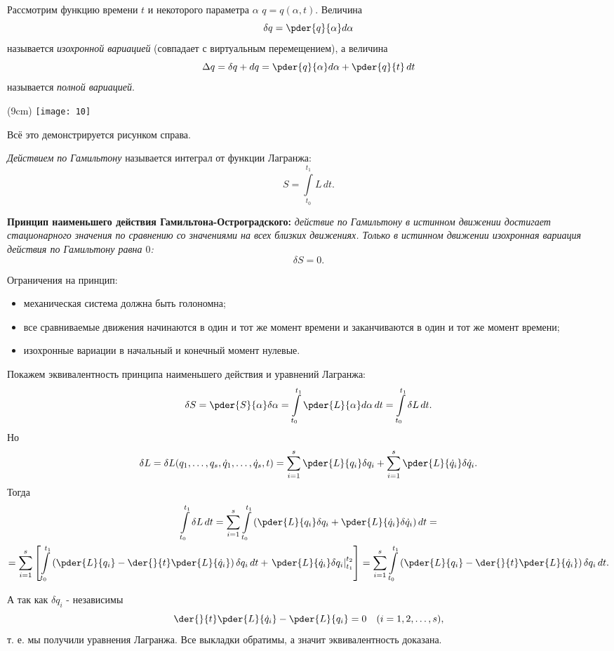 
Рассмотрим функцию времени \( t \) и некоторого параметра \( \alpha \)
\( q=q(\alpha, t) \). Величина 
\[
    \delta q= \pder{q}{\alpha} d\alpha
\]
называется \textit{изохронной вариацией} (совпадает с виртуальным перемещением),
а величина
\[
    \Delta q= \delta q + d q = \pder{q}{\alpha} d\alpha + \pder{q}{t}\,dt
\]
называется \textit{полной вариацией}.


\sidefig(9cm)
{\texttt{[image: 10]}}
{Всё это демонстрируется рисунком справа.

\textit{Действием по Гамильтону} называется интеграл от функции Лагранжа:
\[
        S = \int\limits_{t_0}^{t_1} L\,dt.
\]
}   
\textbf{Принцип наименьшего действия Гамильтона-Остроградского:} \emph{действие
по Гамильтону в истинном движении достигает стационарного значения по сравнению
со значениями на всех близких движениях. Только в истинном движении изохронная
вариация действия по Гамильтону равна \( 0 \):}
\[
    \delta S = 0.
\]

Ограничения на принцип:
\begin{itemize}
\item механическая система должна быть голономна;
\item все сравниваемые движения начинаются в один и тот же момент времени и
    заканчиваются в один и тот же момент времени;
\item изохронные вариации в начальный и конечный момент нулевые.
\end{itemize}

Покажем эквивалентность принципа наименьшего действия и уравнений Лагранжа:
\[
    \delta S =
    \pder{S}{\alpha}\delta\alpha =
    \int\limits_{t_0}^{t_1} \pder{L}{\alpha} d\alpha\,dt =
    \int\limits_{t_0}^{t_1} \delta{L}\,dt.
\]
Но 
\[
    \delta{L} =
    \delta{L}(q_1,\dots,q_s, \dot{q}_1, \dots,  \dot{q}_s, t) =
    \sum\limits_{i=1}^s 
    \pder{L}{q_i}\delta q_i
    +
    \sum\limits_{i=1}^s 
    \pder{L}{\dot{q}_i}\delta\dot{q}_i.
\]
Тогда 
\begin{gather*}
    \int\limits_{t_0}^{t_1} \delta{L}\,dt=
    \sum\limits_{i=1}^s
    \int\limits_{t_0}^{t_1}
    \left(
    \pder{L}{q_i} \delta q_i+
    \pder{L}{\dot{q}_i} \delta  \dot{q}_i
    \right)dt = \\ =
    \sum\limits_{i=1}^s
    \left[
    \int\limits_{t_0}^{t_1}
    \left(
    \pder{L}{q_i} -
    \der{}{t}\pder{L}{\dot{q}_i} 
    \right)\delta  {q}_i\,dt
    +
    \left.  
    \pder{L}{\dot{q}_i} \delta  {q}_i  
    \right|_{t_1}^{t_2}
    \right] =
    \sum\limits_{i=1}^s
    \int\limits_{t_0}^{t_1}
    \left(
    \pder{L}{q_i} -
    \der{}{t}\pder{L}{\dot{q}_i} 
    \right)\delta  {q}_i\,dt.
\end{gather*}

А так как \( \delta q_i \) - независимы
\[
    \der{}{t}\pder{L}{\dot{q}_i} - \pder{L}{q_i} = 0 \quad (i=1,2,\dots,s),
\]  
т. е. мы получили уравнения Лагранжа. Все выкладки обратимы, а значит
эквивалентность доказана. 

\newpage
